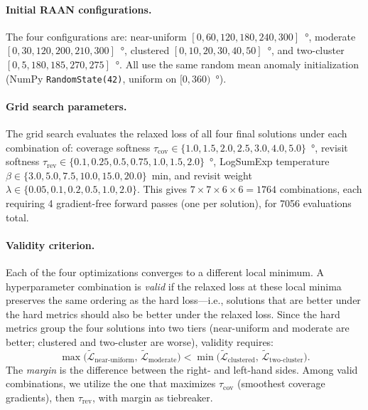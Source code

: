 \paragraph{Initial RAAN configurations.}
The four configurations are: near-uniform $[0, 60, 120, 180, 240, 300]$\SI{}{\degree}, moderate $[0, 30, 120, 200, 210, 300]$\SI{}{\degree}, clustered $[0, 10, 20, 30, 40, 50]$\SI{}{\degree}, and two-cluster $[0, 5, 180, 185, 270, 275]$\SI{}{\degree}.
All use the same random mean anomaly initialization (NumPy \texttt{RandomState(42)}, uniform on $[0, 360)$\SI{}{\degree}).

\paragraph{Grid search parameters.}
The grid search evaluates the relaxed loss of all four final solutions under each combination of: coverage softness $\tau_{\text{cov}} \in \{1.0, 1.5, 2.0, 2.5, 3.0, 4.0, 5.0\}$\SI{}{\degree}, revisit softness $\tau_{\text{rev}} \in \{0.1, 0.25, 0.5, 0.75, 1.0, 1.5, 2.0\}$\SI{}{\degree}, LogSumExp temperature $\beta \in \{3.0, 5.0, 7.5, 10.0, 15.0, 20.0\}$\SI{}{\minute}, and revisit weight $\lambda \in \{0.05, 0.1, 0.2, 0.5, 1.0, 2.0\}$.
This gives $7 \times 7 \times 6 \times 6 = 1764$ combinations, each requiring 4 gradient-free forward passes (one per solution), for 7056 evaluations total.

\paragraph{Validity criterion.}
Each of the four optimizations converges to a different local minimum. A hyperparameter combination is \emph{valid} if the relaxed loss at these local minima preserves the same ordering as the hard loss---i.e., solutions that are better under the hard metrics should also be better under the relaxed loss. Since the hard metrics group the four solutions into two tiers (near-uniform and moderate are better; clustered and two-cluster are worse), validity requires:
\begin{equation}
    \max\bigl(\tilde{\mathcal{L}}_{\text{near-uniform}},\, \tilde{\mathcal{L}}_{\text{moderate}}\bigr) < \min\bigl(\tilde{\mathcal{L}}_{\text{clustered}},\, \tilde{\mathcal{L}}_{\text{two-cluster}}\bigr).
    \label{eq:validity}
\end{equation}
The \emph{margin} is the difference between the right- and left-hand sides.
Among valid combinations, we utilize the one that maximizes $\tau_{\text{cov}}$ (smoothest coverage gradients), then $\tau_{\text{rev}}$, with margin as tiebreaker.

